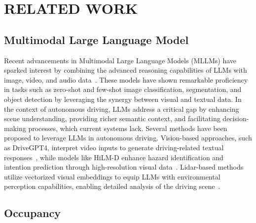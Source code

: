 \section{RELATED WORK}
\subsection{Multimodal Large Language Model}

Recent advancements in Multimodal Large Language Models (MLLMs) have sparked interest by combining the advanced reasoning capabilities of LLMs with image, video, and audio data~\cite{li2023blip,zhu2023minigpt,liu2023visual,lu2024gpt}. These models have shown remarkable proficiency in tasks such as zero-shot and few-shot image classification, segmentation, and object detection by leveraging the synergy between visual and textual data. In the context of autonomous driving, LLMs address a critical gap by enhancing scene understanding, providing richer semantic context, and facilitating decision-making processes, which current systems lack.
Several methods have been proposed to leverage LLMs in autonomous driving. Vision-based approaches, such as DriveGPT4, interpret video inputs to generate driving-related textual responses~\cite{chen2023driving}, while models like HiLM-D enhance hazard identification and intention prediction through high-resolution visual data~\cite{ding2023hilm}. Lidar-based methods utilize vectorized visual embeddings to equip LLMs with environmental perception capabilities, enabling detailed analysis of the driving scene~\cite{fu2023driving}.



\subsection{Occupancy}

